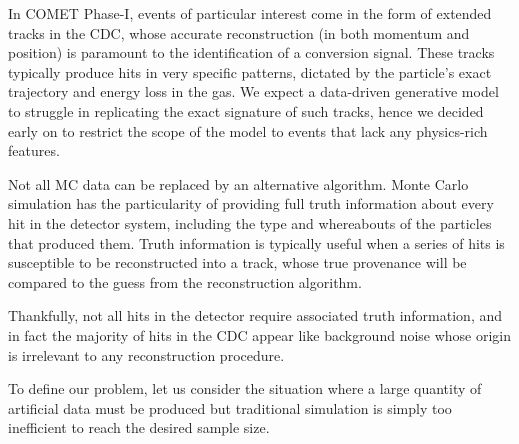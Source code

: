 In COMET Phase-I, events of particular interest come in the form of extended tracks in the CDC, whose accurate reconstruction (in both momentum and position) is paramount to the identification of a conversion signal. These tracks typically produce hits in very specific patterns, dictated by the particle's exact trajectory and energy loss in the gas. We expect a data-driven generative model to struggle in replicating the exact signature of such tracks, hence we decided early on to restrict the scope of the model to events that lack any physics-rich features. 




Not all MC data can be replaced by an alternative algorithm. Monte Carlo simulation has the particularity of providing full truth information about every hit in the detector system, including the type and whereabouts of the particles that produced them.
Truth information is typically useful when a series of hits is susceptible to be reconstructed into a track, whose true provenance will be compared to the guess from the reconstruction algorithm. %

Thankfully, not all hits in the detector require associated truth information, and in fact the majority of hits in the CDC appear like background noise whose origin is irrelevant to any reconstruction procedure. %

To define our problem, let us consider the situation where a large quantity of artificial data must be produced but traditional simulation is simply too inefficient to reach the desired sample size.

